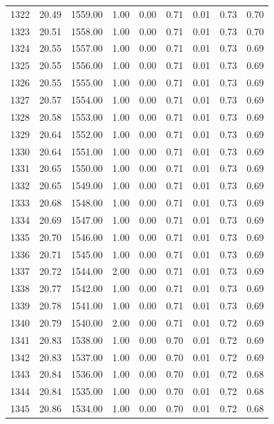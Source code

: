 \documentclass{article}\usepackage[]{graphicx}\usepackage[]{color}
\begin{document}
\begin{longtable}{rrrrrrrrr}
  1322 & 20.49 & 1559.00 & 1.00 & 0.00 & 0.71 & 0.01 & 0.73 & 0.70 \\ 
  1323 & 20.51 & 1558.00 & 1.00 & 0.00 & 0.71 & 0.01 & 0.73 & 0.70 \\ 
  1324 & 20.55 & 1557.00 & 1.00 & 0.00 & 0.71 & 0.01 & 0.73 & 0.69 \\ 
  1325 & 20.55 & 1556.00 & 1.00 & 0.00 & 0.71 & 0.01 & 0.73 & 0.69 \\ 
  1326 & 20.55 & 1555.00 & 1.00 & 0.00 & 0.71 & 0.01 & 0.73 & 0.69 \\ 
  1327 & 20.57 & 1554.00 & 1.00 & 0.00 & 0.71 & 0.01 & 0.73 & 0.69 \\ 
  1328 & 20.58 & 1553.00 & 1.00 & 0.00 & 0.71 & 0.01 & 0.73 & 0.69 \\ 
  1329 & 20.64 & 1552.00 & 1.00 & 0.00 & 0.71 & 0.01 & 0.73 & 0.69 \\ 
  1330 & 20.64 & 1551.00 & 1.00 & 0.00 & 0.71 & 0.01 & 0.73 & 0.69 \\ 
  1331 & 20.65 & 1550.00 & 1.00 & 0.00 & 0.71 & 0.01 & 0.73 & 0.69 \\ 
  1332 & 20.65 & 1549.00 & 1.00 & 0.00 & 0.71 & 0.01 & 0.73 & 0.69 \\ 
  1333 & 20.68 & 1548.00 & 1.00 & 0.00 & 0.71 & 0.01 & 0.73 & 0.69 \\ 
  1334 & 20.69 & 1547.00 & 1.00 & 0.00 & 0.71 & 0.01 & 0.73 & 0.69 \\ 
  1335 & 20.70 & 1546.00 & 1.00 & 0.00 & 0.71 & 0.01 & 0.73 & 0.69 \\ 
  1336 & 20.71 & 1545.00 & 1.00 & 0.00 & 0.71 & 0.01 & 0.73 & 0.69 \\ 
  1337 & 20.72 & 1544.00 & 2.00 & 0.00 & 0.71 & 0.01 & 0.73 & 0.69 \\ 
  1338 & 20.77 & 1542.00 & 1.00 & 0.00 & 0.71 & 0.01 & 0.73 & 0.69 \\ 
  1339 & 20.78 & 1541.00 & 1.00 & 0.00 & 0.71 & 0.01 & 0.73 & 0.69 \\ 
  1340 & 20.79 & 1540.00 & 2.00 & 0.00 & 0.71 & 0.01 & 0.72 & 0.69 \\ 
  1341 & 20.83 & 1538.00 & 1.00 & 0.00 & 0.70 & 0.01 & 0.72 & 0.69 \\ 
  1342 & 20.83 & 1537.00 & 1.00 & 0.00 & 0.70 & 0.01 & 0.72 & 0.69 \\ 
  1343 & 20.84 & 1536.00 & 1.00 & 0.00 & 0.70 & 0.01 & 0.72 & 0.68 \\ 
  1344 & 20.84 & 1535.00 & 1.00 & 0.00 & 0.70 & 0.01 & 0.72 & 0.68 \\ 
  1345 & 20.86 & 1534.00 & 1.00 & 0.00 & 0.70 & 0.01 & 0.72 & 0.68 \\ 

\end{longtable}
\end{document}
